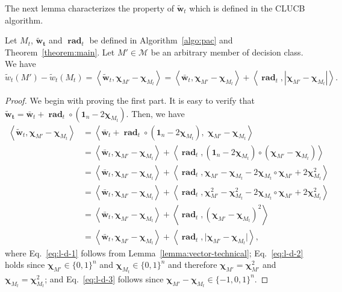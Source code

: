 \documentclass{article}
\newcommand{\junk}[1]{}
\newcommand{\Algorithm}{{\small \textsf{CLUCB}}\xspace}
\newcommand{\M}{\mathcal M}
\DeclareMathOperator{\rad}{rad}
\DeclareMathOperator*{\argmax}{arg\,max}
\newcommand{\inn}[1]{\left\langle #1 \right\rangle}
\renewcommand{\vec}[1]{\boldsymbol{#1}}
\renewcommand{\odot}{\circ}
\begin{document}
The next lemma characterizes the property of $\vec{\tilde w}_t$ which is defined in the \Algorithm algorithm.
\begin{lemma}
Let $M_t$, $\vec{\tilde w_t}$ and $\vec\rad_t$ be defined in Algorithm~\ref{algo:pac} and Theorem~\ref{theorem:main}.
Let $M' \in \M$ be an arbitrary member of decision class.
We have
$$
\tilde w_t(M')-\tilde w_t(M_t) = 
\inn{\tilde{\vec{ w}}_t, \vec \chi_{M'}-\vec \chi_{M_t}} = \inn{\vec {\bar w}_t, \vec \chi_{M'}-\vec\chi_{M_t}}+\inn{\vec \rad_t, |\vec \chi_{M'}-\vec\chi_{M_t}|}.
$$
\label{lemma:tilde}
\end{lemma}
\begin{proof}
We begin with proving the first part.
It is easy to verify that $\vec {\tilde w_t} = \vec {\bar w}_t+ \vec \rad_t \odot (\vec 1_n-2\vec\chi_{M_t})$.
Then, we have
\begin{align}
\inn{\tilde{\vec{w}}_t, \vec \chi_{M'}-\vec \chi_{M_t}}
&= \inn{\vec {\bar w}_t+ \vec \rad_t \odot (\vec 1_n-2\vec\chi_{M_t}), \;\vec \chi_{M'}-\vec \chi_{M_t}} \nonumber \\
&= \inn{\vec {\bar w}_t,\vec \chi_{M'}-\vec \chi_{M_t}}+\inn{\vec \rad_t, (\vec 1_n-2\vec\chi_{M_t}) \odot (\vec \chi_{M'}-\vec \chi_{M_t})}
\label{eq:l-d-1}\\
&= \inn{\vec {\bar w}_t,\vec \chi_{M'}-\vec \chi_{M_t}}+\inn{\vec \rad_t, \vec\chi_{M'}-\vec\chi_{M_t}-2\vec\chi_{M_t}\odot\vec\chi_{M'}+2\vec\chi_{M_t}^2 } \nonumber\\
&= \inn{\vec {\bar w}_t,\vec \chi_{M'}-\vec \chi_{M_t}}+\inn{\vec \rad_t, \vec\chi_{M'}^2-\vec\chi_{M_t}^2-2\vec\chi_{M_t}\odot\vec\chi_{M'}+2\vec\chi_{M_t}^2 }
\label{eq:l-d-2}\\
&= \inn{\vec {\bar w}_t,\vec \chi_{M'}-\vec \chi_{M_t}}+\inn{\vec \rad_t, (\vec\chi_{M'}-\vec\chi_{M_t})^2}
\nonumber \\ \
&= \inn{\vec {\bar w}_t,\vec \chi_{M'}-\vec \chi_{M_t}}+\inn{\vec \rad_t, \big|\vec\chi_{M'}-\vec\chi_{M_t}\big|},
\label{eq:l-d-3}
\end{align}
where
Eq.~\eqref{eq:l-d-1} follows from Lemma~\ref{lemma:vector-technical};
Eq.~\eqref{eq:l-d-2} holds since $\vec \chi_{M'}\in \{0,1\}^n$ and $\vec \chi_{M_t}\in \{0,1\}^n$
and therefore $\vec\chi_{M'}=\vec\chi_{M'}^2$ and $\vec\chi_{M_t}=\vec\chi_{M_t}^2$;
and Eq.~\eqref{eq:l-d-3} follows since $\vec\chi_{M'}-\vec\chi_{M_t}\in \{-1,0,1\}^n$.
\junk{
Next, recall that $\tilde M_t = \argmax_{M\in \M} \tilde w_t(M)$.
Therefore, we have $\tilde w_t(\tilde M_t) \ge \tilde w_t(M')$.
Subtracting $\tilde w_t(M_t)$ from both sides of the former inequality, we have
\begin{equation}
\tilde w_t(\tilde M_t)-\tilde w_t(M_t) \ge \tilde w_t(M')-\tilde w_t(M_t).
\label{eq:l-d-4}
\end{equation}
The lemma follows by noticing that the left-hand side of Eq.~\eqref{eq:l-d-4} equals to 
$\inn{\vec {\bar w}_t,\vec \chi_{\tilde M_t}-\vec \chi_{M_t}}+\inn{\vec \rad_t, \big|\vec\chi_{\tilde M_t}-\vec\chi_{M_t}\big|}$
and the right-hand side equals to
$\inn{\vec {\bar w}_t,\vec \chi_{M'}-\vec \chi_{M_t}}+\inn{\vec \rad_t, \big|\vec\chi_{M'}-\vec\chi_{M_t}\big|}$.
}
\end{proof}
\end{document}
